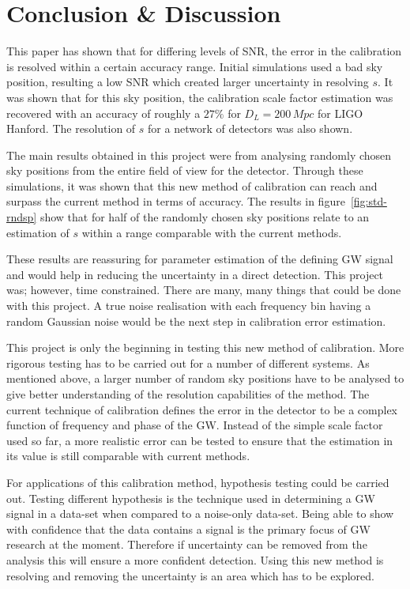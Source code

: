 \documentclass{jpconf}
\begin{document}
\section{Conclusion \& Discussion}
\label{sec:concl}

This paper has shown that for differing levels of SNR, the error in the calibration is resolved within a certain accuracy range. Initial simulations used a bad sky position, resulting a low SNR which created larger uncertainty in resolving $s$. It was shown that for this sky position, the calibration scale factor estimation was recovered with an accuracy of roughly a $27\%$ for $D_{L} = 200\,Mpc$ for LIGO Hanford. The resolution of $s$ for a network of detectors was also shown.  

The main results obtained in this project were from analysing randomly chosen sky positions from the entire field of view for the detector. Through these simulations, it was shown that this new method of calibration can reach and surpass the current method in terms of accuracy. The results in figure~\ref{fig:std-rndsp} show that for half of the randomly chosen sky positions relate to an estimation of $s$ within a range comparable with the current methods. 

These results are reassuring for parameter estimation of the defining GW signal and would help in reducing the uncertainty in a direct detection. This project was; however, time constrained. There are many, many things that could be done with this project. A true noise realisation with each frequency bin having a random Gaussian noise would be the next step in calibration error estimation.

This project is only the beginning in testing this new method of calibration. More rigorous testing has to be carried out for a number of different systems. As mentioned above, a larger number of random sky positions have to be analysed to give better understanding of the resolution capabilities of the method. The current technique of calibration defines the error in the detector to be a complex function of frequency and phase of the GW. Instead of the simple scale factor used so far, a more realistic error can be tested to ensure that the estimation in its value is still comparable with current methods. 


For applications of this calibration method, hypothesis testing could be carried out. Testing different hypothesis is the technique used in determining a GW signal in a data-set when compared to a noise-only data-set. Being able to show with confidence that the data contains a signal is the primary focus of GW research at the moment. Therefore if uncertainty can be removed from the analysis this will ensure a more confident detection. Using this new method is resolving and removing the uncertainty is an area which has to be explored.
 
\end{document}
